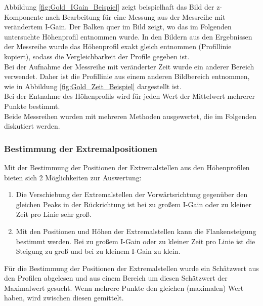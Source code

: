 \documentclass[12pt,a4paper]{article}
\begin{document}
Abbildung \ref{fig:Gold_IGain_Beispiel} zeigt beispielhaft das Bild der z-Komponente nach Bearbeitung für eine Messung aus der Messreihe mit verändertem I-Gain. Der Balken quer im Bild zeigt, wo das im Folgenden untersuchte Höhenprofil entnommen wurde. In den Bildern aus den Ergebnissen der Messreihe wurde das Höhenprofil exakt gleich entnommen (Profillinie kopiert), sodass die Vergleichbarkeit der Profile gegeben ist.\\
Bei der Aufnahme der Messreihe mit veränderter Zeit wurde ein anderer Bereich verwendet. Daher ist die Profillinie aus einem anderen Bildbereich entnommen, wie in Abbildung \ref{fig:Gold_Zeit_Beispiel} dargestellt ist.\\
Bei der Entnahme des Höhenprofils wird für jeden Wert der Mittelwert mehrerer Punkte bestimmt.\\
Beide Messreihen wurden mit mehreren Methoden ausgewertet, die im Folgenden diskutiert werden.

\subsubsection{Bestimmung der Extremalpositionen}
Mit der Bestimmung der Positionen der Extremalstellen aus den Höhenprofilen bieten sich 2 Möglichkeiten zur Auswertung:
\begin{enumerate}
\item Die Verschiebung der Extremalstellen der Vorwärtsrichtung gegenüber den gleichen Peaks in der Rückrichtung ist bei zu großem I-Gain oder zu kleiner Zeit pro Linie sehr groß.
\item Mit den Positionen und Höhen der Extremalstellen kann die Flankensteigung bestimmt werden. Bei zu großem I-Gain oder zu kleiner Zeit pro Linie ist die Steigung zu groß und bei zu kleinem I-Gain zu klein.
\end{enumerate}

Für die Bestimmung der Positionen der Extremalstellen wurde ein Schätzwert aus den Profilen abgelesen und aus einem Bereich um diesen Schätzwert der Maximalwert gesucht. Wenn mehrere Punkte den gleichen (maximalen) Wert haben, wird zwischen diesen gemittelt.
\end{document}
